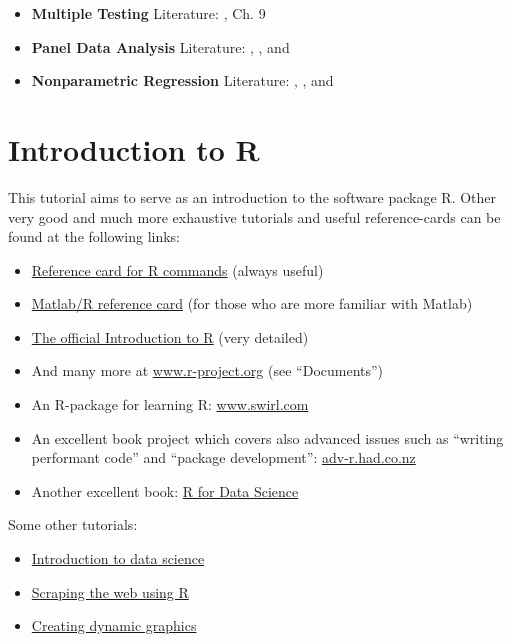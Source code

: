 \documentclass[]{book}
\providecommand{\tightlist}{%
  \setlength{\itemsep}{0pt}\setlength{\parskip}{0pt}}
\theoremstyle{definition}
\theoremstyle{definition}
\theoremstyle{definition}
\theoremstyle{remark}
\begin{document}
\begin{itemize}
\item
  \textbf{Multiple Testing}
  Literature: \citet{BHW2010}, \citet{Lehmann2006} Ch. 9
\item
  \textbf{Panel Data Analysis}
  Literature: \citet{H2014}, \citet{G2003}, and \citet{B2008}
\item
  \textbf{Nonparametric Regression}
  Literature: \citet{LR2007}, \citet{FG1996}, and \citet{WJ1994}
\end{itemize}

\hypertarget{introduction-to-r}{%
\chapter{Introduction to R}\label{introduction-to-r}}

This tutorial aims to serve as an introduction to the software package R. Other very good and much more exhaustive tutorials and useful reference-cards can be found at the following links:

\begin{itemize}
\tightlist
\item
  \href{http://cran.r-project.org/doc/contrib/refcard.pdf}{Reference card for R commands} (always useful)
\item
  \href{http://www.math.umaine.edu/~hiebeler/comp/matlabR.pdf}{Matlab/R reference card} (for those who are more familiar with Matlab)
\item
  \href{https://cran.r-project.org/doc/manuals/r-release/R-intro.pdf}{The official Introduction to R} (very detailed)
\item
  And many more at \href{https://www.r-project.org/other-docs.html}{www.r-project.org} (see ``Documents'')
\item
  An R-package for learning R: \href{https://swirlstats.com/}{www.swirl.com}
\item
  An excellent book project which covers also advanced issues such as ``writing performant code'' and ``package development'': \href{http://adv-r.had.co.nz/}{adv-r.had.co.nz}\\
\item
  Another excellent book: \href{https://r4ds.had.co.nz/}{R for Data Science}
\end{itemize}

Some other tutorials:

\begin{itemize}
\tightlist
\item
  \href{https://idc9.github.io/stor390/}{Introduction to data science}
\item
  \href{https://stat4701.github.io/edav/2015/04/02/rvest_tutorial/}{Scraping the web using R}
\item
  \href{https://gganimate.com/}{Creating dynamic graphics}
\end{itemize}
\end{document}
